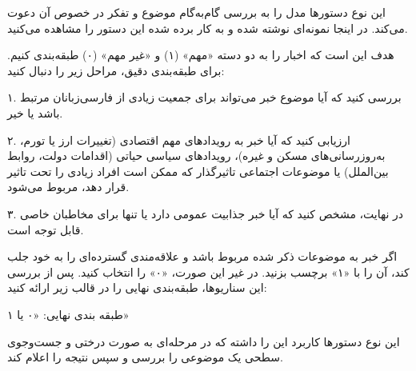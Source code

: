 این نوع دستور‌ها مدل را به بررسی گام‌به‌گام موضوع و تفکر در خصوص آن دعوت می‌کند. در اینجا نمونه‌ای نوشته شده و به کار برده شده این دستور را مشاهده می‌کنید.

\vspace{5pt}
\begin{scriptsize}
\begin{itshape}
هدف این است که اخبار را به دو دسته «مهم» (۱) و «غیر مهم» (۰) طبقه‌بندی کنیم. برای طبقه‌بندی دقیق، مراحل زیر را دنبال کنید:

۱. بررسی کنید که آیا موضوع خبر می‌تواند برای جمعیت زیادی از فارسی‌زبانان مرتبط باشد یا خیر.

۲. ارزیابی کنید که آیا خبر به رویدادهای مهم اقتصادی (تغییرات ارز یا تورم، به‌روزرسانی‌های مسکن و غیره)، رویدادهای سیاسی حیاتی (اقدامات دولت، روابط بین‌الملل) یا موضوعات اجتماعی تاثیرگذار که ممکن است افراد زیادی را تحت تاثیر قرار دهد، مربوط می‌شود.

۳. در نهایت، مشخص کنید که آیا خبر جذابیت عمومی دارد یا تنها برای مخاطبان خاصی قابل توجه است.

اگر خبر به موضوعات ذکر شده مربوط باشد و علاقه‌مندی گسترده‌ای را به خود جلب کند، آن را با «۱» برچسب بزنید. در غیر این صورت، «۰» را انتخاب کنید. پس از بررسی این سناریوها، طبقه‌بندی نهایی را در قالب زیر ارائه کنید:

طبقه بندی نهایی: «۰ یا ۱»
\end{itshape}
\end{scriptsize}
\vspace{5pt}

این نوع دستور‌ها کاربرد این را داشته که در مرحله‌ای به صورت درختی و جست‌وجوی سطحی یک موضوعی را بررسی و سپس نتیجه‌ را اعلام کند.


